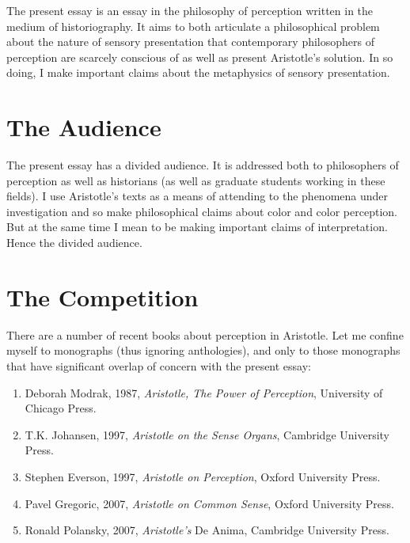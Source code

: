 \documentclass[12pt]{article}
\begin{document}
The present essay is an essay in the philosophy of perception written in the medium of historiography. It aims to both articulate a philosophical problem about the nature of sensory presentation that contemporary philosophers of perception are scarcely conscious of as well as present Aristotle's solution. In so doing, I make important claims about the metaphysics of sensory presentation.


\section{The Audience} %
\label{sec:the_audience}

The present essay has a divided audience. It is addressed both to philosophers of perception as well as historians (as well as graduate students working in these fields). I use Aristotle's texts as a means of attending to the phenomena under investigation and so make philosophical claims about color and color perception. But at the same time I mean to be making important claims of interpretation. Hence the divided audience.


\section{The Competition} %
\label{sec:the_competition}

There are a number of recent books about perception in Aristotle. Let me confine myself to monographs (thus ignoring anthologies), and only to those monographs that have significant overlap of concern with the present essay:

\begin{enumerate}
	\item Deborah Modrak, 1987, \emph{Aristotle, The Power of Perception}, University of Chicago Press.
	\item T.K. Johansen, 1997, \emph{Aristotle on the Sense Organs}, Cambridge University Press.
	\item Stephen Everson, 1997, \emph{Aristotle on Perception}, Oxford University Press.
	\item Pavel Gregoric, 2007, \emph{Aristotle on Common Sense}, Oxford University Press.
	\item Ronald Polansky, 2007, \emph{Aristotle's} De Anima, Cambridge University Press.
\end{enumerate}
\end{document}
